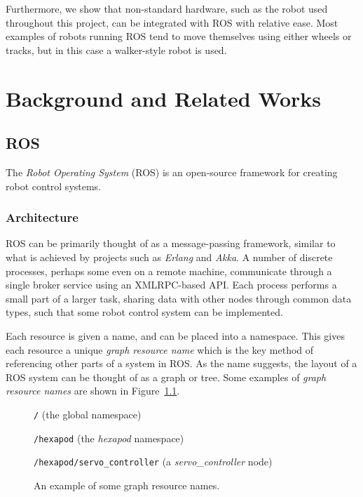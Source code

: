 \documentclass{l4proj}
\begin{document}
Furthermore, we show that non-standard hardware, such as the robot used throughout this project, can be integrated with ROS with relative ease. Most examples of robots running ROS tend to move themselves using either wheels or tracks, but in this case a walker-style robot is used.


\chapter{Background and Related Works}

\section{ROS}

The \emph{Robot Operating System} (ROS) \cite{ros_site} is an open-source framework for creating robot control systems.

\subsection{Architecture}
ROS can be primarily thought of as a message-passing framework, similar to what is achieved by projects such as \emph{Erlang} \cite{erlang} and \emph{Akka}. A number of discrete processes, perhaps some even on a remote machine, communicate through a single broker service using an XMLRPC-based API. Each process performs a small part of a larger task, sharing data with other nodes through common data types, such that some robot control system can be implemented.

Each resource is given a name, and can be placed into a namespace. This gives each resource a unique \emph{graph resource name} which is the key method of referencing other parts of a system in ROS. As the name suggests, the layout of a ROS system can be thought of as a graph or tree. Some examples of \emph{graph resource names} are shown in Figure~\ref{fig:graph_resource_names}.

\begin{figure}[h!]
    \centering

    \texttt{/} (the global namespace)

    \texttt{/hexapod} (the \emph{hexapod} namespace)

    \texttt{/hexapod/servo\_controller} (a \emph{servo\_controller} node)

    \caption{An example of some graph resource names.}
    \label{fig:graph_resource_names}
\end{figure}
\end{document}
